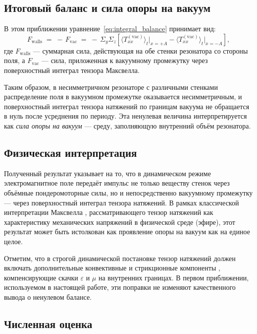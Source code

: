 \documentclass[a4paper,10pt]{article}
\newcommand{\modblock}[1]{\colorbox{modcolor!10}{\parbox{\dimexpr\linewidth-2\fboxsep}{#1}}}
\begin{document}
\modblock{

\subsection{Итоговый баланс и сила опоры на вакуум}

В этом приближении уравнение~\eqref{eq:integral_balance} принимает вид:
\begin{equation}
\label{eq:final_balance}
\boxed{
F_{\mathrm{walls}} \;=\; -\, F_{\mathrm{vac}}
\;=\; -\, \Sigma_y \Sigma_z \left[
\langle T_{xx}^{(\mathrm{vac})} \rangle_t \Big|_{x=+A}
- \langle T_{xx}^{(\mathrm{vac})} \rangle_t \Big|_{x=-A}
\right],
}
\end{equation}
где $F_{\mathrm{walls}}$ --- суммарная сила, действующая на обе стенки резонатора со стороны поля, а $F_{\mathrm{vac}}$ --- сила, приложенная к вакуумному промежутку через поверхностный интеграл тензора Максвелла.

Таким образом, в несимметричном резонаторе с различными стенками распределение поля в вакуумном промежутке оказывается несимметричным, и поверхностный интеграл тензора натяжений по границам вакуума не обращается в нуль после усреднения по периоду. Эта ненулевая величина интерпретируется как \emph{сила опоры на вакуум} --- среду, заполняющую внутренний объём резонатора.

\subsection{Физическая интерпретация}

Полученный результат указывает на то, что в динамическом режиме электромагнитное поле передаёт импульс
не только веществу стенок через объёмные пондеромоторные силы, но и
непосредственно вакуумному промежутку --- через поверхностный интеграл тензора натяжений.
В рамках классической интерпретации Максвелла \cite{Maxwell1873}, рассматривающего тензор
натяжений как характеристику механических напряжений в физической среде (эфире),
этот результат может быть истолкован как проявление опоры на вакуум как на единое целое.

Отметим, что в строгой динамической постановке тензор натяжений должен включать дополнительные
конвективные и стрикционные компоненты \cite{Tamm1957}, компенсирующие скачки $\varepsilon$ и $\mu$ на внутренних границах.
В первом приближении, используемом в настоящей работе, эти поправки не изменяют качественного вывода о ненулевом балансе.

\subsection{Численная оценка}

}
\end{document}
